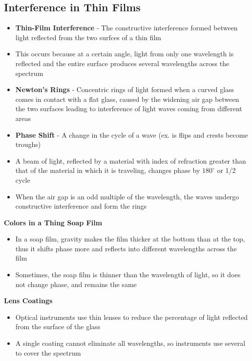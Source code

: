 \subsection{Interference in Thin Films}
\begin{itemize}
    \item \textbf{Thin-Film Interference} - The constructive interference formed between light reflected from the two surfces of a thin film
    \item This occurs because at a certain angle, light from only one wavelength is reflected and the entire surface produces several wavelengths across the spectrum
    \item \textbf{Newton's Rings} - Concentric rings of light formed when a curved glass comes in contact with a flat glass, caused by the widening air gap between the two surfaces leading to interference of light waves coming from different areas 
    \item \textbf{Phase Shift} - A change in the cycle of a wave (ex. is flips and crests become troughs)
    \item A beam of light, reflected by a material with index of refraction greater than that of the material in which it is traveling, changes phase by \(180^\circ\) or 1/2 cycle
    \item When the air gap is an odd multiple of the wavelength, the waves undergo constructive interference and form the rings
\end{itemize}

\textbf{Colors in a Thing Soap Film}
\begin{itemize}
    \item In a soap film, gravity makes the film thicker at the bottom than at the top, thus it shifts phase more and reflects into different wavelengths across the film
    \item Sometimes, the soap film is thinner than the wavelength of light, so it does not change phase, and remains the same
\end{itemize}

\textbf{Lens Coatings}
\begin{itemize}
    \item Optical instruments use thin lenses to reduce the percentage of light reflected from the surface of the glass
    \item A single coating cannot eliminate all wavelengths, so instruments use several to cover the spectrum
\end{itemize}


